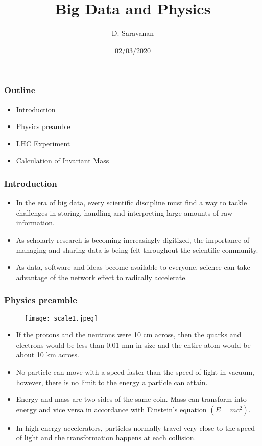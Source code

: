 \documentclass[8pt]{beamer}
\title{Big Data and Physics}
\author{\normalsize{D. Saravanan}}
\institute{
	\normalsize{Advance Diploma in Big Data Analytics}\\
	\normalsize{National Institute of Electronis and Information Technology Chennai}
	}
\date{02/03/2020}
\begin{document}
\begin{frame}
\titlepage
\end{frame}

\begin{frame}
\frametitle{Outline}
\begin{itemize}
\item Introduction
\item Physics preamble
\item LHC Experiment
\item Calculation of Invariant Mass
\end{itemize}
\end{frame}

\begin{frame}
\frametitle{Introduction}
\begin{itemize}
\begin{figure}[ht!]
\texttt{[image: lhc\_computing.jpeg]}
\end{figure}
\item In the era of big data, every scientific discipline must find a way to tackle
 challenges in storing, handling and interpreting large amounts of raw information.
 \\[0.5cm]
\item As scholarly research is becoming increasingly digitized, the importance of 
 managing and sharing data is being felt throughout the scientific community.\\[0.5cm]
\item As data, software and ideas become available to everyone, science can take 
advantage of the network effect to radically accelerate.\\[0.5cm]
\end{itemize}
\end{frame}

\begin{frame}
\frametitle{Physics preamble}
\begin{figure}[ht!]
\texttt{[image: scale1.jpeg]}
\centering
\end{figure}
\begin{itemize}
\item If the protons and the neutrons were 10 cm across, then the quarks and electrons
would be less than 0.01 mm in size and the entire atom would be about 10 km
across.\\[0.5cm]
\item No particle can move with a speed faster than the speed of light in vacuum, 
however, there is no limit to the energy a particle can attain.\\[0.5cm]
\item Energy and mass are two sides of the same coin. Mass can transform into energy
and vice versa in accordance with Einstein's equation $(E = mc^{2})$.\\[0.5cm]
\item In high-energy accelerators, particles normally travel very close to the speed of
light and the transformation happens at each collision.
\end{itemize}
\end{frame}
\end{document}
